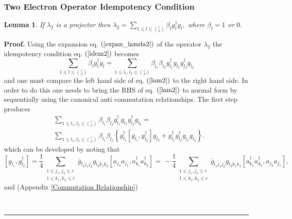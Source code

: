 \documentclass[aps,preprint]{revtex4}%
\newtheorem{lemma}[theorem]{Lemma}
\newenvironment{proof}[1][Proof]{\noindent\textbf{#1.} }{\ \rule{0.5em}{0.5em}}
\begin{document}
\subsubsection{Two Electron Operator Idempotency Condition}

\begin{lemma}
If $\lambda_{2}$ is a projector then $\lambda_{2}=\sum\limits_{1\leq
l\leq\binom{r}{2}}\beta_{l}g_{l}^{\dagger}g_{l},$ where $\beta_{l}=1$ or $0.$
\end{lemma}

\begin{proof}
Using the expansion eq. $\left(  \ref{expan_lamda2}\right)  $ of the operator
$\lambda_{2}$ the idempotency condition eq. $\left(  \ref{idem2}\right)  $
becomes
\begin{equation}
\sum_{1\leq l\leq\binom{r}{2}}\beta_{l}g_{l}^{\dagger}g_{l}=\sum_{1\leq
l_{1},l_{2}\leq\binom{r}{2}}\beta_{l_{1}}\beta_{l_{2}}g_{l_{1}}^{\dagger
}g_{l_{1}}g_{l_{2}}^{\dagger}g_{l_{2}} \label{lam2}%
\end{equation}
and one must compare the left hand side of eq. $\left(  \ref{lam2}\right)  $
to the right hand side. In order to do this one needs to bring the RHS of eq.
$\left(  \ref{lam2}\right)  $ to normal form by sequentially using the
canonical anti commutation relationships. The first step produces
\begin{align}
&  \sum_{1\leq l_{1},l_{2}\leq\binom{r}{2}}\beta_{l_{1}}\beta_{l_{2}}g_{l_{1}%
}^{\dagger}g_{l_{1}}g_{l_{2}}^{\dagger}g_{l_{2}}=\nonumber\\
&  \sum_{1\leq l_{1},l_{2}\leq\binom{r}{2}}\beta_{l_{1}}\beta_{l_{2}}\left\{
g_{l_{1}}^{\dagger}\left[  g_{l_{1}},g_{l_{2}}^{\dagger}\right]  g_{l_{2}%
}+g_{l_{1}}^{\dagger}g_{l_{2}}^{\dagger}g_{l_{1}}g_{l_{2}}\right\}  .
\label{normform}%
\end{align}
which can be developed by noting that%
\begin{equation}
\left[  g_{l_{1}},g_{l_{2}}^{\dagger}\right]  =\frac{1}{4}\sum
_{\substack{1\leq j_{1},j_{2}\leq r\\1\leq k_{1},k_{2}\leq r}}\bar{g}%
_{l_{1}j_{1}j_{2}}g_{l_{2}k_{1}k_{2}}\left[  a_{j_{2}}a_{j_{1}},a_{k_{1}%
}^{\dagger}a_{k_{2}}^{\dagger}\right]  =\,-\frac{1}{4}\sum_{\substack{1\leq
j_{1},j_{2}\leq r\\1\leq k_{1},k_{2}\leq r}}\bar{g}_{l_{1}j_{1}j_{2}}%
g_{l_{2}k_{1}k_{2}}\left[  a_{k_{1}}^{\dagger}a_{k_{2}}^{\dagger},a_{j_{2}%
}a_{j_{1}}\right]  ,
\end{equation}
and (Appendix \ref{Commutation Relationship})

\end{proof}
\end{document}
